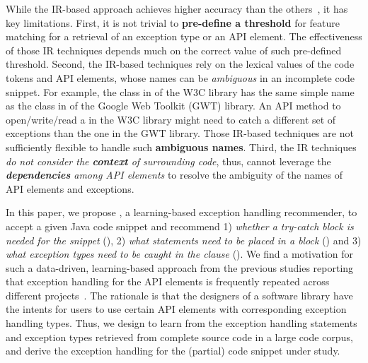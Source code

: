 While the IR-based approach achieves higher accuracy than the
others~\cite{xrank-fse20}, it has key limitations. First, it is
not trivial to {\bf pre-define a threshold} for feature matching for a
retrieval of an exception type or an API element. The effectiveness of
those IR techniques depends much on the correct value of such
pre-defined threshold. Second, the IR-based techniques rely on the
lexical values of the code tokens and API elements, whose names can be
{\em ambiguous} in an incomplete code snippet. For example, the
 class in  of the W3C library has
the same simple name as the  class in
 of the Google Web
Toolkit (GWT) library. An API method to open/write/read a
 in the W3C library might need to catch a different set
of exceptions than the one in the GWT library. Those IR-based
techniques are not sufficiently flexible to handle such {\bf ambiguous
  names}. Third, the IR techniques {\em do not consider the {\bf
    context} of surrounding code}, thus, cannot leverage the {\em {\bf
    dependencies} among API elements} to resolve the ambiguity of the
names of API elements and exceptions.

In this paper, we propose {\tool}, a learning-based exception handling
recommender, to accept a given Java code snippet and recommend 1) {\em
  whether a try-catch block is needed for the snippet} ({\xblock}), 2)
{\em what statements need to be placed in a  block}
({\xstate}) and 3) {\em what exception types need to be caught in the
   clause} ({\xtype}).  We find a motivation for such a
data-driven, learning-based approach from the previous studies
reporting that exception handling for the API elements is frequently
repeated across different
projects~\cite{chanchal-scam14,zhong-jss18}. The rationale is that the
designers of a software library have the intents for users to use
certain API elements with corresponding exception handling types.
Thus, we design {\tool} to learn from the exception handling
statements and exception types retrieved from complete source code in
a large code corpus, and derive the exception handling for the
(partial) code snippet under study.


